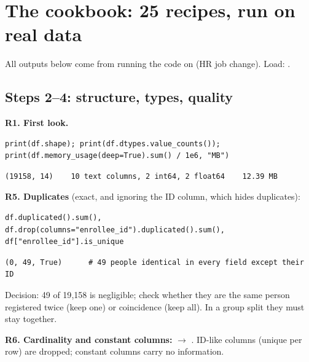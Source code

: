 \section{The cookbook: 25 recipes, run on real data}
All outputs below come from running the code on  (HR job change). Load: .

\subsection{Steps 2--4: structure, types, quality}
\textbf{R1. First look.}
\begin{lstlisting}
print(df.shape); print(df.dtypes.value_counts()); print(df.memory_usage(deep=True).sum() / 1e6, "MB")
\end{lstlisting}
\outlabel
\begin{lstlisting}[style=out]
(19158, 14)    10 text columns, 2 int64, 2 float64    12.39 MB
\end{lstlisting}
\textbf{R5. Duplicates} (exact, and ignoring the ID column, which hides duplicates):
\begin{lstlisting}
df.duplicated().sum(), df.drop(columns="enrollee_id").duplicated().sum(), df["enrollee_id"].is_unique
\end{lstlisting}
\outlabel
\begin{lstlisting}[style=out]
(0, 49, True)      # 49 people identical in every field except their ID
\end{lstlisting}
Decision: 49 of 19{,}158 is negligible; check whether they are the same person registered twice (keep one) or coincidence (keep all). In a group split they must
stay together.

\textbf{R6. Cardinality and constant columns:}  $\to$ . ID-like columns (unique per row) are dropped; constant columns carry no information.

